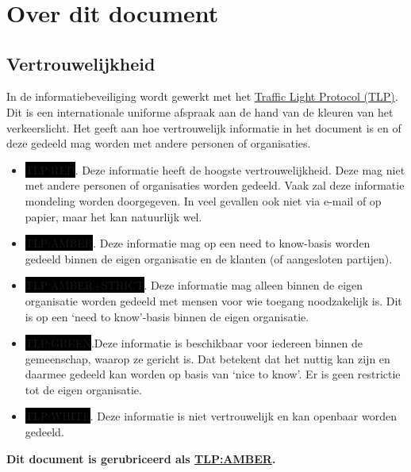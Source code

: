\documentclass[11pt, a4paper]{report}
\title{ \reporttitle{} }
\author{ \application{} }
\newcommand\tlp{AMBER}
\begin{document}
\maketitle



\chapter{Over dit document}
\section{Vertrouwelijkheid}
In de informatiebeveiliging wordt gewerkt met het
\href{https://www.ncsc.nl/onderwerpen/traffic-light-protocol}{Traffic
Light Protocol (TLP)}. Dit is een internationale uniforme afspraak aan
de hand van de kleuren van het verkeerslicht. Het geeft aan hoe
vertrouwelijk informatie in het document is en of deze gedeeld mag
worden met andere personen of organisaties.

\begin{itemize}
     \item \colorbox{black}{\color{red}TLP:RED}. Deze informatie heeft
de hoogste vertrouwelijkheid. Deze mag niet met andere personen of
organisaties worden gedeeld. Vaak zal deze informatie mondeling worden
doorgegeven. In veel gevallen ook niet via e-mail of op papier, maar het
kan natuurlijk wel.
     \item \colorbox{black}{\color{orange}TLP:AMBER}. Deze informatie
mag op een need to know-basis worden gedeeld binnen de eigen organisatie
en de klanten (of aangesloten partijen).
     \item \colorbox{black}{\color{orange}TLP:AMBER+STRICT}. Deze
informatie mag alleen binnen de eigen organisatie worden gedeeld met
mensen voor wie toegang noodzakelijk is. Dit is op een `need to
know'-basis binnen de eigen organisatie.
     \item \colorbox{black}{\color{green}TLP:GREEN}.Deze informatie is
beschikbaar voor iedereen binnen de gemeenschap, waarop ze gericht is.
Dat betekent dat het nuttig kan zijn en daarmee gedeeld kan worden op
basis van `nice to know'. Er is geen restrictie tot de eigen organisatie.
     \item \colorbox{black}{\color{white}TLP:WHITE}. Deze informatie is
niet vertrouwelijk en kan openbaar worden gedeeld.
\end{itemize}

\textbf{Dit document is gerubriceerd als \underline{TLP:\tlp}.}
\end{document}
